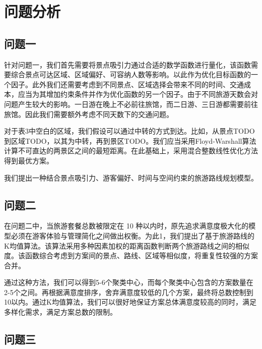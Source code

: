 \chapter[\hspace{0pt}问题分析]{{\heiti{}\hspace{0pt}问题分析}}\label{chapter1: 问题分析}
\removelofgap
\removelotgap

\section[\hspace{-2pt}问题一]{{\heiti{} \hspace{-8pt}问题一}}\label{section1: 问题一}

针对问题一，我们首先需要将景点吸引力通过合适的数学函数进行量化，该函数需要综合景点可达区域、区域偏好、可容纳人数等影响。以此作为优化目标函数的一个因子。此外我们还需要考虑到不同景点、区域选择会带来不同的时间、交通成本，应当为其增加约束条件并作为优化函数的另一个因子。由于不同旅游天数会对问题产生较大的影响。一日游在晚上不必前往旅馆，而二日游、三日游都需要前往旅馆。因此我们需要额外考虑不同天数下的交通问题。

对于表3中空白的区域，我们假设可以通过中转的方式到达。比如，从景点TODO到区域TODO，以其为中转，再到景区TODO。我们应当采用Floyd‑Warshall算法计算不可直达的两景区之间的最短距离。在此基础上，采用混合整数线性优化方法得到最优方案。

我们提出一种结合景点吸引力、游客偏好、时间与空间约束的旅游路线规划模型。

\section[\hspace{-2pt}问题二]{{\heiti{} \hspace{-8pt}问题二}}\label{section1: 问题二}

在问题二中，当旅游套餐总数被限定在 10 种以内时，原先追求满意度极大化的模型必须在游客体验与管理简化之间做出权衡。为此1，我们提出了基于旅游路线的K均值算法。该算法采用多种因素加权的距离函数判断两个旅游路线之间的相似度。该函数综合考虑到方案间的景点、路线、区域等相似度，将重复性较强的方案合并。

通过这种方法，我们可以得到5-6个聚类中心，而每个聚类中心包含的方案数量在2-5个之间。再根据满意度排序，舍弃满意度较低的几个方案，最终将总数控制到10以内。通过K均值算法，我们可以很好地保证方案总体满意度较高的同时，满足多样化需求，满足方案总数的限制。

\section[\hspace{-2pt}问题三]{{\heiti{} \hspace{-8pt}问题三}}\label{section1: 问题三}



